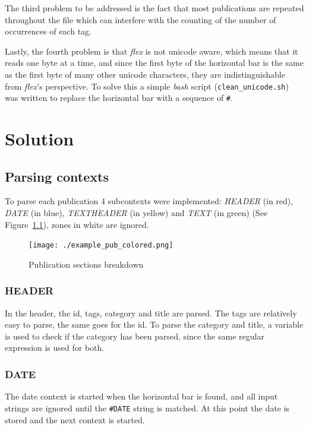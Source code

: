 \documentclass[a4paper]{report}
\begin{document}
The third problem to be addressed is the fact that most publications
are repeated throughout the file which can interfere with the counting of the
number of occurrences of each tag.

Lastly, the fourth problem is that \textit{flex} is not unicode aware,
which means that it reads one byte at a time, and since the first byte of the
horizontal bar is the same as the first byte of many other unicode characters,
they are indistinguishable from \textit{flex}'s perspective. To solve this a
simple \textit{bash} script (\texttt{clean\_unicode.sh}) was written to replace
the horizontal bar with a sequence of \verb!#!.

\chapter{Solution}

\section{Parsing contexts}

To parse each publication 4 subcontexts were implemented: \textit{HEADER} (in
red), \textit{DATE} (in blue), \textit{TEXTHEADER} (in yellow) and
\textit{TEXT} (in green) (See Figure~\ref{fig:example_pub_colored}), zones in
white are ignored.

\begin{figure}[h]
    \texttt{[image: ./example\_pub\_colored.png]}
    \caption{Publication sections breakdown}\label{fig:example_pub_colored}
\end{figure}

\subsection{HEADER}

In the header, the id, tags, category and title are parsed. The tags are
relatively easy to parse, the same goes for the id. To parse the category and
title, a variable is used to check if the category has been parsed, since the
same regular expression is used for both.

\subsection{DATE}

The date context is started when the horizontal bar is found, and all input
strings are ignored until the \texttt{\#DATE} string is matched. At this point
the date is stored and the next context is started.
\end{document}
